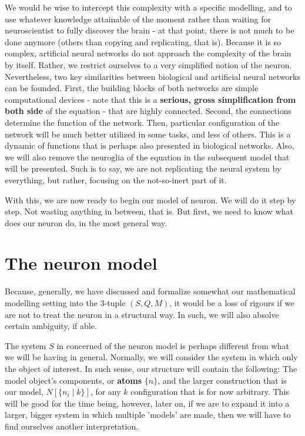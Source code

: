 We would be wise to intercept this complexity with a specific modelling, and to use whatever knowledge attainable of the moment rather than waiting for neuroscientist to fully discover the brain - at that point, there is not much to be done anymore (others than copying and replicating, that is). Because it is so complex, artificial neural networks do not approach the complexity of the brain by itself. Rather, we restrict ourselves to a very simplified notion of the neuron. Nevertheless, two key similarities between biological and artificial neural networks can be founded. First, the building blocks of both networks are simple computational devices - note that this is a \textbf{serious, gross simplification from both side} of the equation - that are highly connected. Second, the connections determine the function of the network. Then, particular configuration of the network will be much better utilized in some tasks, and less of others. This is a dynamic of functions that is perhaps also presented in biological networks. Also, we will also remove the neuroglia of the equation in the subsequent model that will be presented. Such is to say, we are not replicating the neural system by everything, but rather, focusing on the not-so-inert part of it.

With this, we are now ready to begin our model of neuron. We will do it step by step. Not wasting anything in between, that is. But first, we need to know what does our neuron do, in the most general way. 

\section{The neuron model}

Because, generally, we have discussed and formalize somewhat our mathematical modelling setting into the 3-tuple $(S,Q,M)$, it would be a loss of rigours if we are not to treat the neuron in a structural way. In such, we will also absolve certain ambiguity, if able.  

The system $S$ in concerned of the neuron model is perhaps different from what we will be having in general. Normally, we will consider the system in which only the object of interest. In such sense, our structure will contain the following: The model object's components, or \textbf{atoms} $\{n\}$, and the larger construction that is our model, $N[\{n_{i}\mid k\}]$, for any $k$ configuration that is for now arbitrary. This will be good for the time being, however, later on, if we are to expand it into a larger, bigger system in which multiple 'models' are made, then we will have to find ourselves another interpretation. 

